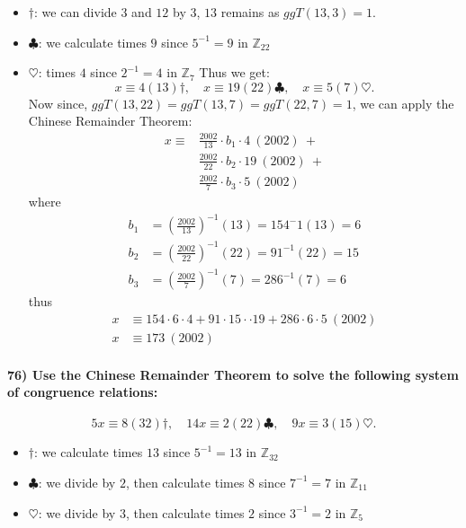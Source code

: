 \documentclass[
]{article}
\providecommand{\tightlist}{%
  \setlength{\itemsep}{0pt}\setlength{\parskip}{0pt}}
\begin{document}
\begin{itemize}
\tightlist
\item
  \(\dagger\): we can divide \(3\) and \(12\) by \(3\), \(13\) remains
  as \(ggT(13,3) = 1\).
\item
  \(\clubsuit\): we calculate times \(9\) since \(5^{-1} = 9\) in
  \(\mathbb{Z}_{22}\)
\item
  \(\heartsuit\): times \(4\) since \(2^{-1} = 4\) in \(\mathbb{Z}_7\)
  Thus we get: \[
  x \equiv 4(13) \mathit{\dagger}, \quad x \equiv 19(22)\clubsuit, \quad x \equiv 5 (7) \heartsuit.
  \] Now since, \(ggT(13,22) = ggT(13,7) = ggT(22,7) = 1\), we can apply
  the Chinese Remainder Theorem: \[
  \begin{aligned}
  x \equiv &\frac{2002}{13} \cdot b_1 \cdot 4 \ (2002) \ + \\
  &\frac{2002}{22} \cdot b_2 \cdot 19 \ (2002) \ + \\
  &\frac{2002}{7} \cdot b_3 \cdot 5 \ (2002)
  \end{aligned}
  \] where \[
  \begin{aligned}
  b_1 &= (\frac{2002}{13})^{-1} (13) = 154^-1 (13)  = 6\\
  b_2 &= (\frac{2002}{22})^{-1} (22) = 91^{-1} (22) = 15\\
  b_3 &= (\frac{2002}{7})^{-1} (7) = 286^{-1} (7) = 6
  \end{aligned}
  \] thus \[
  \begin{aligned}
  x &\equiv 154 \cdot 6 \cdot 4 + 91 \cdot 15 \cdot \cdot 19 + 286 \cdot 6 \cdot 5 \ (2002) \\
  x &\equiv 173 \ (2002)
  \end{aligned}
  \]
\end{itemize}

\hypertarget{use-the-chinese-remainder-theorem-to-solve-the-following-system-of-congruence-relations-1}{%
\paragraph{76) Use the Chinese Remainder Theorem to solve the following
system of congruence
relations:}\label{use-the-chinese-remainder-theorem-to-solve-the-following-system-of-congruence-relations-1}}

\[
5x \equiv 8(32) \mathit{\dagger}, 
\quad 14x \equiv 2(22)\clubsuit, 
\quad 9x \equiv 3 (15) \heartsuit.
\]

\begin{itemize}
\tightlist
\item
  \(\dagger\): we calculate times \(13\) since \(5^{-1} = 13\) in
  \(\mathbb{Z}_{32}\)
\item
  \(\clubsuit\): we divide by \(2\), then calculate times \(8\) since
  \(7^{-1} = 7\) in \(\mathbb{Z}_{11}\)
\item
  \(\heartsuit\): we divide by \(3\), then calculate times \(2\) since
  \(3^{-1} = 2\) in \(\mathbb{Z}_5\)
\end{itemize}
\end{document}
